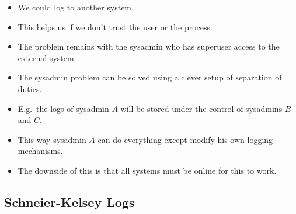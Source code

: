 \begin{frame}
  \begin{solution}
    \begin{itemize}
      \item We could log to another system.
      \item This helps us if we don't trust the user or the process.
    \end{itemize}
  \end{solution}

  \pause

  \begin{remark}
    \begin{itemize}
      \item The problem remains with the sysadmin who has superuser access to 
        the external system.
    \end{itemize}
  \end{remark}
\end{frame}

\begin{frame}
  \begin{solution}
    \begin{itemize}
      \item The sysadmin problem can be solved using a clever setup of 
        separation of duties.

      \item E.g.\ the logs of sysadmin \(A\) will be stored under the control of 
        sysadmins \(B\) and \(C\).

      \item This way sysadmin \(A\) can do everything except modify his own 
        logging mechanisms.

      \item The downside of this is that all systems must be online for this to 
        work.
    \end{itemize}
  \end{solution}
\end{frame}

\subsection{Schneier-Kelsey Logs}

